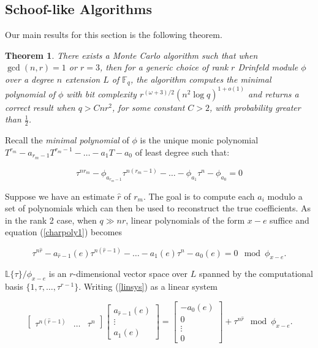 \documentclass[sigconf]{acmart}
\newtheorem{theorem}{Theorem}
\newcommand{\F}{\mathbb{F}}
\renewcommand{\L}{\mathbb{L}}
\newcommand{\hatr}{\hat{r}}
\begin{document}
\subsection{Schoof-like Algorithms}

Our main results for this section is the following theorem.

\begin{theorem}\label{schooflike}
There exists a Monte Carlo algorithm such that when $\gcd(n,r) = 1$ or $r = 3$, then for a generic choice of rank $r$ Drinfeld module $\phi$ over a degree $n$ extension $L$ of  $\F_q$, the algorithm computes the minimal polynomial of $\phi$ with bit complexity $r^{(\omega+3)/2}(n^2 \log q)^{1 + o(1)}$ and returns a correct result when $q > Cnr^2$, for some constant $C > 2$, with probability greater than $\frac{1}{2}$.
\end{theorem}

Recall the \textit{minimal polynomial} of $\phi$ is the unique monic polynomial $T^{r_m} - a_{r_m-1}T^{r_m-1} - \ldots - a_1T - a_0$ of least degree such that:

\begin{equation} \label{charpoly1}
 \tau^{nr_m} - \phi_{a_{r_m-1}}\tau^{n(r_m-1)} - \ldots - \phi_{a_1} \tau^n - \phi_{a_0} = 0
\end{equation}


Suppose we have an estimate $\hatr$ of $r_m$. The goal is to compute each $a_i$ modulo a set of polynomials which can then be used to reconstruct the true coefficients. As in the rank 2 case, when $q \gg nr$, linear polynomials of the form $x - e$ suffice and equation (\ref{charpoly1}) becomes

\begin{equation}\label{linsys}
\tau^{n\hatr} - a_{\hatr-1}(e)\tau^{n(\hatr-1)} - \ldots - a_1(e)\tau^n - a_0(e)  = 0 \mod \phi_{x - e}.
\end{equation}

$\L\{\tau \}/\phi_{x-e}$ is an $r$-dimensional vector space over $L$ spanned by the computational basis $\{1, \tau, \ldots, \tau^{r-1}\}$. Writing (\ref{linsys}) as a linear system

\begin{equation}\label{system1} \begin{bmatrix} \tau^{n(\hatr-1)} & \ldots & \tau^{n} \end{bmatrix} \begin{bmatrix} a_{\hatr-1}(e) \\ \vdots \\ a_1(e) \end{bmatrix} = \begin{bmatrix}  -a_0(e) \\ 0 \\ \vdots \\ 0  \end{bmatrix} + \tau^{n\hatr}  \mod \phi_{x-e}.
\end{equation}
\end{document}
